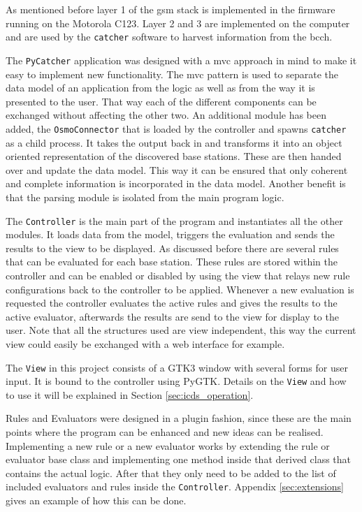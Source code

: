 As mentioned before layer 1 of the \gls{gsm} stack is implemented in the firmware running on the Motorola C123.
Layer 2 and 3 are implemented on the computer and are used by the \texttt{catcher} software to harvest information from the \gls{bcch}.

The \texttt{PyCatcher} application was designed with a \gls{mvc} approach in mind to make it easy to implement new functionality.
The \gls{mvc} pattern is used to separate the data model of an application from the logic as well as from the way it is presented to the user.
That way each of the different components can be exchanged without affecting the other two.
An additional module has been added, the \texttt{OsmoConnector} that is loaded by the controller and spawns \texttt{catcher} as a child process.
It takes the output back in and transforms it into an object oriented representation of the discovered base stations.
These are then handed over and update the data model.
This way it can be ensured that only coherent and complete information is incorporated in the data model.
Another benefit is that the parsing module is isolated from the main program logic.

The \texttt{Controller} is the main part of the program and instantiates all the other modules.
It loads data from the model, triggers the evaluation and sends the results to the view to be displayed.
As discussed before there are several rules that can be evaluated for each base station.
These rules are stored within the controller and can be enabled or disabled by using the view that relays new rule configurations back to the controller to be applied. 
Whenever a new evaluation is requested the controller evaluates the active rules and gives the results to the active evaluator, afterwards the results are send to the view for display to the user.
Note that all the structures used are view independent, this way the current view could easily be exchanged with a web interface for example.

The \texttt{View} in this project consists of a GTK3 window with several forms for user input.
It is bound to the controller using PyGTK.
Details on the \texttt{View} and how to use it will be explained in Section \ref{sec:icds_operation}.

Rules and Evaluators were designed in a plugin fashion, since these are the main points where the program can be enhanced and new ideas can be realised.
Implementing a new rule or a new evaluator works by extending the rule or evaluator base class and implementing one method inside that derived class that contains the actual logic.
After that they only need to be added to the list of included evaluators and rules inside the \texttt{Controller}.
Appendix \ref{sec:extensions} gives an example of how this can be done.

